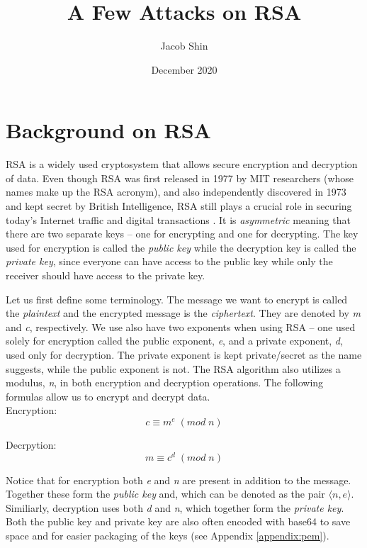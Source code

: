 \documentclass[11pt]{article}
\title{A Few Attacks on RSA}
\author{Jacob Shin}
\date{December 2020}
\begin{document}
\maketitle


\section{Background on RSA}
RSA is a widely used cryptosystem that allows secure encryption and decryption of data. Even though RSA was first released in 1977 by MIT researchers (whose names make up the RSA acronym), and also independently discovered in 1973 and kept secret by British Intelligence, RSA still plays a crucial role in securing today's Internet traffic and digital transactions \cite{boneh, rosen}. It is \emph{asymmetric} meaning that there are two separate keys -- one for encrypting and one for decrypting. The key used for encryption is called the \emph{public key} while the decryption key is called the \emph{private key}, since everyone can have access to the public key while only the receiver should have access to the private key.

Let us first define some terminology. The message we want to encrypt is called the \emph{plaintext} and the encrypted message is the \emph{ciphertext}. They are denoted by \emph{m} and \emph{c}, respectively. We use also have two exponents when using RSA -- one used solely for encryption called the public exponent, \emph{e}, and a private exponent, \emph{d}, used only for decryption. The private exponent is kept private/secret as the name suggests, while the public exponent is not. The RSA algorithm also utilizes a modulus, \emph{n}, in both encryption and decryption operations. The following formulas allow us to encrypt and decrypt data.\\

Encryption:
\begin{equation} c \equiv m^e \; (mod \; n)\end{equation}

Decrpytion:
\begin{equation} m \equiv c^d \; (mod \; n)\end{equation}

Notice that for encryption both \emph{e} and \emph{n} are present in addition to the message. Together these form the \emph{public key} and, which can be denoted as the pair $\langle n, e \rangle$. Similiarly, decryption uses both \emph{d} and \emph{n}, which together form the \emph{private key}. Both the public key and private key are also often encoded with base64 to save space and for easier packaging of the keys (see Appendix \ref{appendix:pem}).\\
\end{document}
